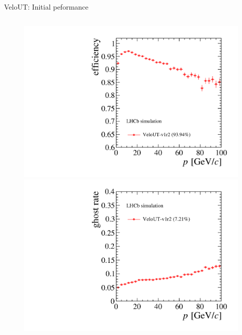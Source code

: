 \documentclass[aspectratio=1610]{beamer}
\begin{document}
\begin{frame}{VeloUT: Initial peformance}
\begin{columns}
\begin{column}{0.35\textwidth}
\centering
\begin{figure}
\vspace*{-1cm}
\includegraphics[height=0.475\textheight]{figs/upstream-tracking-upgrade/eff_p_v1r2.pdf}\\
\includegraphics[height=0.475\textheight]{figs/upstream-tracking-upgrade/gr_p_v1r2.pdf}
\end{figure}
\end{column}
\end{columns}

\end{frame}
\end{document}
